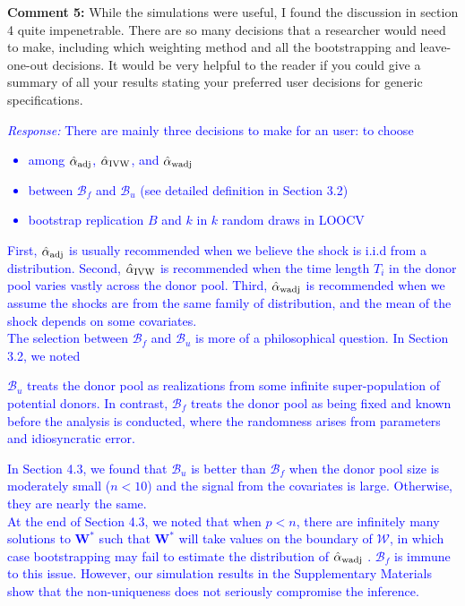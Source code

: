 \documentclass[12pt]{article}
\newcommand{\response}[1]{\noindent \textcolor{blue}{\emph{Response:} #1}}
\begin{document}
{\bf Comment 5:} While the simulations were useful, I found the discussion in section 4 quite impenetrable. There are so many decisions that a researcher would need to make, including which weighting method and all the bootstrapping and leave-one-out decisions. It would be very helpful to the reader if you could give a summary of all your results stating your preferred user decisions for generic specifications. \\

\response{There are mainly three decisions to make for an user: to choose 
  \begin{itemize}
    \item among  $\hat{\alpha}_{\rm adj}$, $\hat{\alpha}_{\rm IVW}$, and $\hat{\alpha}_{\rm wadj}$ 
    \item between $\mathcal{B}_f$ and $\mathcal{B}_u$ (see detailed definition in Section 3.2)
    \item bootstrap replication $B$ and $k$ in $k$ random draws in LOOCV
  \end{itemize}
  First, $\hat{\alpha}_{\rm adj}$ is usually recommended when we believe the shock is i.i.d from a distribution. Second, $\hat{\alpha}_{\rm IVW}$ is recommended when the time length $T_i$ in the donor pool varies vastly across the donor pool. Third, $\hat{\alpha}_{\rm wadj}$  is recommended when we assume the shocks are from the same family of distribution, and the mean of the shock depends on some covariates. \\
  
  The selection between $\mathcal{B}_f$ and $\mathcal{B}_u$ is more of a philosophical question. In Section 3.2,  we noted
  
  \begin{tcolorbox}
  $\mathcal{B}_u$ treats the donor pool as realizations from some infinite super-population of potential donors. In contrast, $\mathcal{B}_f$ treats the donor pool as being fixed  and known before the analysis is conducted, where the randomness arises from parameters and idiosyncratic error.   
  \end{tcolorbox}

In Section 4.3, we found that $\mathcal{B}_u$ is better than $\mathcal{B}_f$ when  the donor pool size is moderately small ($n< 10$) and the signal from the covariates is large. Otherwise, they are nearly the same. \\


At the end of Section 4.3, we noted that when $p < n$, there are infinitely many solutions to $\mathbf{W}^*$ such that $\mathbf{W}^*$ will take values on the boundary of $\mathcal{W}$, in which case bootstrapping may fail to estimate the distribution of $\hat{\alpha}_{\rm wadj}$ \citep{andrews2000inconsistency}. $\mathcal{B}_f$  is immune to this issue. However, our simulation results in the Supplementary Materials show that the non-uniqueness does not seriously compromise the inference. \\



}
\end{document}
